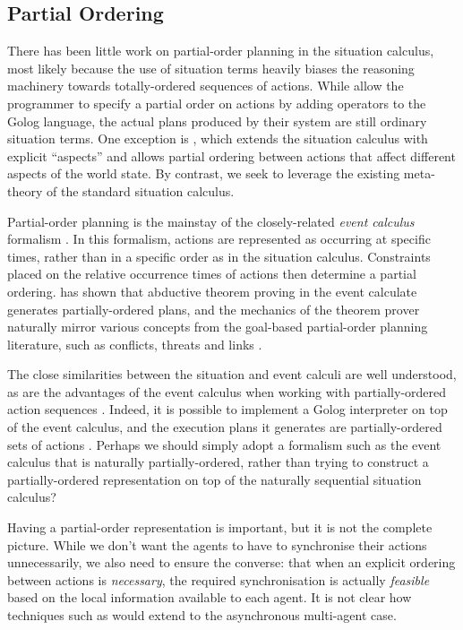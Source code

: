 \subsection{Partial Ordering}

There has been little work on partial-order planning in the situation
calculus, most likely because the use of situation terms heavily biases
the reasoning machinery towards totally-ordered sequences of actions.
While \citet{son00htn_golog} allow the programmer to specify a partial
order on actions by adding operators to the Golog language, the actual
plans produced by their system are still ordinary situation terms.
One exception is \citep{plaisted97sc_aspect}, which extends the situation
calculus with explicit {}``aspects'' and allows partial ordering
between actions that affect different aspects of the world state.
By contrast, we seek to leverage the existing meta-theory of the standard
situation calculus.

Partial-order planning is the mainstay of the closely-related \emph{event
calculus} formalism \citep{kowalski86event_calculus}. In this formalism,
actions are represented as occurring at specific times, rather than
in a specific order as in the situation calculus. Constraints placed
on the relative occurrence times of actions then determine a partial
ordering. \citet{Shanahan97ec_planning} has shown that abductive
theorem proving in the event calculate generates partially-ordered
plans, and the mechanics of the theorem prover naturally mirror various
concepts from the goal-based partial-order planning literature, such
as conflicts, threats and links \citep{peot92conditional_nonlinear}.

The close similarities between the situation and event calculi are
well understood, as are the advantages of the event calculus when
working with partially-ordered action sequences \citep{belleghem97sitcalc_evtcalc}.
Indeed, it is possible to implement a Golog interpreter on top of
the event calculus, and the execution plans it generates are partially-ordered
sets of actions \citep{pereira04ec_golog}. Perhaps we should simply
adopt a formalism such as the event calculus that is naturally partially-ordered,
rather than trying to construct a partially-ordered representation
on top of the naturally sequential situation calculus?

Having a partial-order representation is important, but it is not
the complete picture. While we don't want the agents to have to synchronise
their actions unnecessarily, we also need to ensure the converse:
that when an explicit ordering between actions is \emph{necessary},
the required synchronisation is actually \emph{feasible} based on
the local information available to each agent. It is not clear how
techniques such as \citep{pereira04ec_golog} would extend to the
asynchronous multi-agent case.

